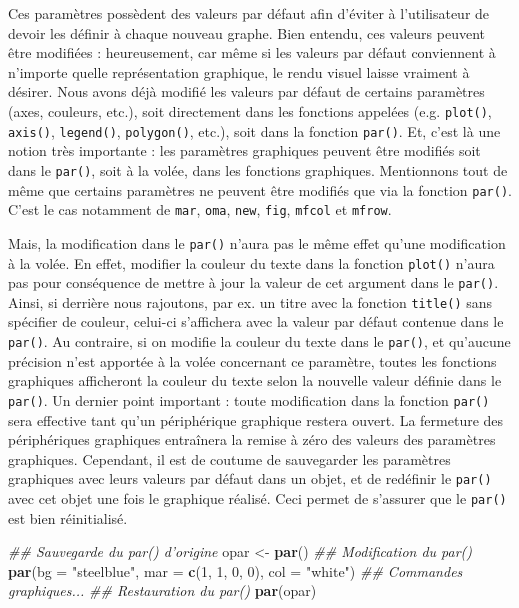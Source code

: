 \documentclass[]{article}
\newenvironment{Shaded}{\begin{snugshade}}{\end{snugshade}}
\newcommand{\CommentTok}[1]{\textcolor[rgb]{0.56,0.35,0.01}{\textit{#1}}}
\newcommand{\DataTypeTok}[1]{\textcolor[rgb]{0.13,0.29,0.53}{#1}}
\newcommand{\DecValTok}[1]{\textcolor[rgb]{0.00,0.00,0.81}{#1}}
\newcommand{\KeywordTok}[1]{\textcolor[rgb]{0.13,0.29,0.53}{\textbf{#1}}}
\newcommand{\NormalTok}[1]{#1}
\newcommand{\StringTok}[1]{\textcolor[rgb]{0.31,0.60,0.02}{#1}}
\begin{document}
Ces paramètres possèdent des valeurs par défaut afin d'éviter à l'utilisateur de devoir les définir à chaque nouveau graphe. Bien entendu, ces valeurs peuvent être modifiées : heureusement, car même si les valeurs par défaut conviennent à n'importe quelle représentation graphique, le rendu visuel laisse vraiment à désirer. Nous avons déjà modifié les valeurs par défaut de certains paramètres (axes, couleurs, etc.), soit directement dans les fonctions appelées (e.g. \texttt{plot()}, \texttt{axis()}, \texttt{legend()}, \texttt{polygon()}, etc.), soit dans la fonction \texttt{par()}.
Et, c'est là une notion très importante : les paramètres graphiques peuvent être modifiés soit dans le \texttt{par()}, soit à la volée, dans les fonctions graphiques. Mentionnons tout de même que certains paramètres ne peuvent être modifiés que via la fonction \texttt{par()}. C'est le cas notamment de \texttt{mar}, \texttt{oma}, \texttt{new}, \texttt{fig}, \texttt{mfcol} et \texttt{mfrow}.

Mais, la modification dans le \texttt{par()} n'aura pas le même effet qu'une modification à la volée. En effet, modifier la couleur du texte dans la fonction \texttt{plot()} n'aura pas pour conséquence de mettre à jour la valeur de cet argument dans le \texttt{par()}. Ainsi, si derrière nous rajoutons, par ex. un titre avec la fonction \texttt{title()} sans spécifier de couleur, celui-ci s'affichera avec la valeur par défaut contenue dans le \texttt{par()}. Au contraire, si on modifie la couleur du texte dans le \texttt{par()}, et qu'aucune précision n'est apportée à la volée concernant ce paramètre, toutes les fonctions graphiques afficheront la couleur du texte selon la nouvelle valeur définie dans le \texttt{par()}.
Un dernier point important : toute modification dans la fonction \texttt{par()} sera effective tant qu'un périphérique graphique restera ouvert. La fermeture des périphériques graphiques entraînera la remise à zéro des valeurs des paramètres graphiques. Cependant, il est de coutume de sauvegarder les paramètres graphiques avec leurs valeurs par défaut dans un objet, et de redéfinir le \texttt{par()} avec cet objet une fois le graphique réalisé. Ceci permet de s'assurer que le \texttt{par()} est bien réinitialisé.

\begin{Shaded}
\begin{Highlighting}[]
\CommentTok{## Sauvegarde du par() d'origine}
\NormalTok{opar <-}\StringTok{ }\KeywordTok{par}\NormalTok{()}
\CommentTok{## Modification du par()}
\KeywordTok{par}\NormalTok{(}\DataTypeTok{bg =} \StringTok{"steelblue"}\NormalTok{, }\DataTypeTok{mar =} \KeywordTok{c}\NormalTok{(}\DecValTok{1}\NormalTok{, }\DecValTok{1}\NormalTok{, }\DecValTok{0}\NormalTok{, }\DecValTok{0}\NormalTok{), }\DataTypeTok{col =} \StringTok{"white"}\NormalTok{)}
\CommentTok{## Commandes graphiques...}
\CommentTok{## Restauration du par()}
\KeywordTok{par}\NormalTok{(opar)}
\end{Highlighting}
\end{Shaded}
\end{document}
